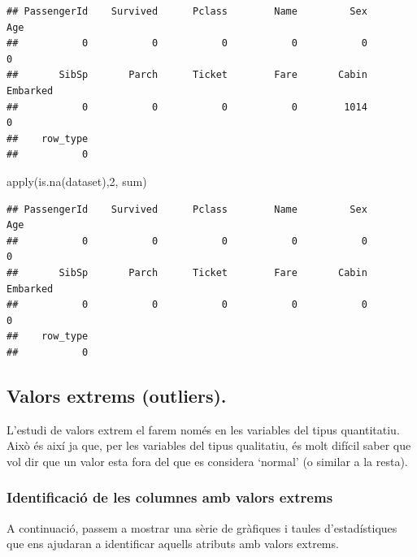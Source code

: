 \documentclass[
]{article}
\newenvironment{Shaded}{\begin{snugshade}}{\end{snugshade}}
\newcommand{\AttributeTok}[1]{\textcolor[rgb]{0.80,0.80,0.80}{#1}}
\newcommand{\CommentTok}[1]{\textcolor[rgb]{0.50,0.62,0.50}{#1}}
\newcommand{\DecValTok}[1]{\textcolor[rgb]{0.86,0.86,0.80}{#1}}
\newcommand{\FunctionTok}[1]{\textcolor[rgb]{0.94,0.94,0.56}{#1}}
\newcommand{\NormalTok}[1]{\textcolor[rgb]{0.80,0.80,0.80}{#1}}
\newcommand{\SpecialCharTok}[1]{\textcolor[rgb]{0.86,0.64,0.64}{#1}}
\newcommand{\StringTok}[1]{\textcolor[rgb]{0.80,0.58,0.58}{#1}}
\begin{document}
\begin{verbatim}
## PassengerId    Survived      Pclass        Name         Sex         Age 
##           0           0           0           0           0           0 
##       SibSp       Parch      Ticket        Fare       Cabin    Embarked 
##           0           0           0           0        1014           0 
##    row_type 
##           0
\end{verbatim}

\begin{Shaded}
\begin{Highlighting}[]
\FunctionTok{apply}\NormalTok{(}\FunctionTok{is.na}\NormalTok{(dataset),}\DecValTok{2}\NormalTok{, sum)}
\end{Highlighting}
\end{Shaded}

\begin{verbatim}
## PassengerId    Survived      Pclass        Name         Sex         Age 
##           0           0           0           0           0           0 
##       SibSp       Parch      Ticket        Fare       Cabin    Embarked 
##           0           0           0           0           0           0 
##    row_type 
##           0
\end{verbatim}

\hypertarget{valors-extrems-outliers.}{%
\subsection{Valors extrems (outliers).}\label{valors-extrems-outliers.}}

L'estudi de valors extrem el farem només en les variables del tipus
quantitatiu. Això és així ja que, per les variables del tipus
qualitatiu, és molt difícil saber que vol dir que un valor esta fora del
que es considera `normal' (o similar a la resta).

\hypertarget{identificaciuxf3-de-les-columnes-amb-valors-extrems}{%
\subsubsection{Identificació de les columnes amb valors
extrems}\label{identificaciuxf3-de-les-columnes-amb-valors-extrems}}

A continuació, passem a mostrar una sèrie de gràfiques i taules
d'estadístiques que ens ajudaran a identificar aquells atributs amb
valors extrems.

\begin{Shaded}
\end{Shaded}
\end{document}
